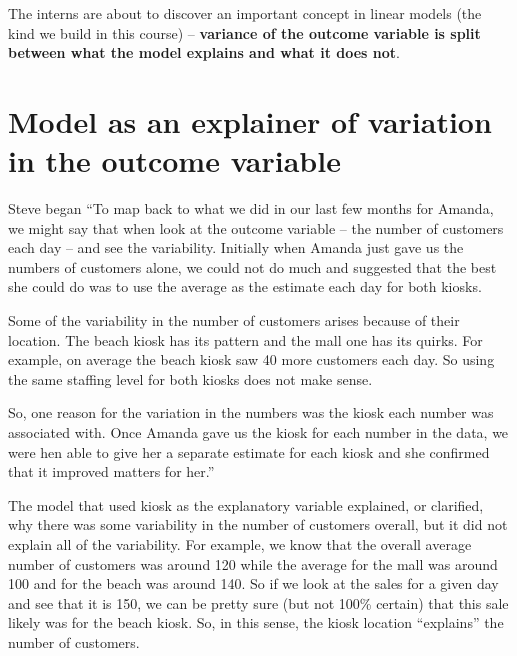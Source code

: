 \documentclass[
  12pt,
  letterpaper,
  DIV=11,
  numbers=noendperiod]{scrreprt}
\begin{document}
The interns are about to discover an important concept in linear models
(the kind we build in this course) -- \textbf{variance of the outcome
variable is split between what the model explains and what it does not}.

\section{Model as an explainer of variation in the outcome
variable}\label{model-as-an-explainer-of-variation-in-the-outcome-variable}

Steve began ``To map back to what we did in our last few months for
Amanda, we might say that when look at the outcome variable -- the
number of customers each day -- and see the variability. Initially when
Amanda just gave us the numbers of customers alone, we could not do much
and suggested that the best she could do was to use the average as the
estimate each day for both kiosks.

Some of the variability in the number of customers arises because of
their location. The beach kiosk has its pattern and the mall one has its
quirks. For example, on average the beach kiosk saw 40 more customers
each day. So using the same staffing level for both kiosks does not make
sense.

So, one reason for the variation in the numbers was the kiosk each
number was associated with. Once Amanda gave us the kiosk for each
number in the data, we were hen able to give her a separate estimate for
each kiosk and she confirmed that it improved matters for her.''

\begin{tcolorbox}[enhanced jigsaw, colback=white, leftrule=.75mm, toprule=.15mm, bottomtitle=1mm, breakable, coltitle=black, toptitle=1mm, title=\textcolor{quarto-callout-important-color}{\faExclamation}\hspace{0.5em}{Important}, opacitybacktitle=0.6, colbacktitle=quarto-callout-important-color!10!white, arc=.35mm, left=2mm, colframe=quarto-callout-important-color-frame, titlerule=0mm, rightrule=.15mm, bottomrule=.15mm, opacityback=0]

The model that used kiosk as the explanatory variable explained, or
clarified, why there was some variability in the number of customers
overall, but it did not explain all of the variability. For example, we
know that the overall average number of customers was around 120 while
the average for the mall was around 100 and for the beach was around
140. So if we look at the sales for a given day and see that it is 150,
we can be pretty sure (but not 100\% certain) that this sale likely was
for the beach kiosk. So, in this sense, the kiosk location ``explains''
the number of customers.

\end{tcolorbox}
\end{document}
